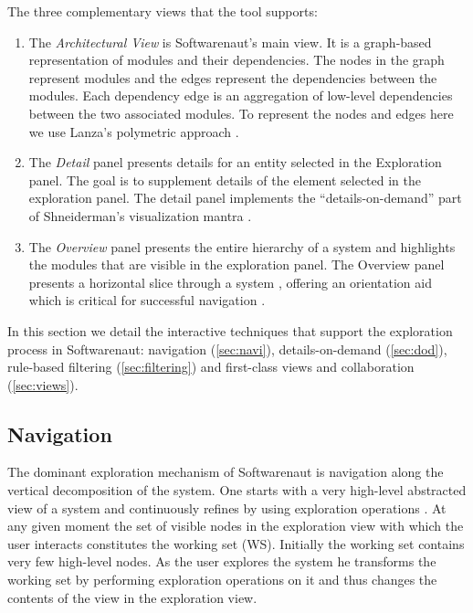 \documentclass[preprint,12pt]{elsarticle}
\begin{document}
The three complementary views that the tool supports:

\begin{enumerate}

\item The {\em Architectural View} is Softwarenaut's main view. It is a graph-based representation of modules and their dependencies. The nodes in the graph represent modules and the edges represent the dependencies between the modules. Each dependency edge is an aggregation of low-level dependencies between the two associated modules. To represent the nodes and edges here we use Lanza's polymetric approach \cite{lanza-pv, lanza-oomp}. 

\item The {\em Detail} panel presents details for an entity selected in the Exploration panel. The goal is to supplement details of the element selected in the exploration panel. The detail panel implements the ``details-on-demand'' part of Shneiderman's visualization mantra \cite{shneid-eyes}.

\item The {\em Overview} panel presents the entire hierarchy of a system and highlights the modules that are visible in the exploration panel. The Overview panel presents a horizontal slice through a system \cite{wong-thesis}, offering an orientation aid which is critical for successful navigation \cite{storey-awareness}.

\end{enumerate}

In this section we detail the interactive techniques that support the exploration process in Softwarenaut: navigation (\ref{sec:navi}), details-on-demand (\ref{sec:dod}), rule-based filtering (\ref{sec:filtering}) and first-class views and collaboration (\ref{sec:views}).  

\subsection{Navigation} 

The dominant exploration mechanism of Softwarenaut is navigation along the vertical decomposition of the system. One starts with a very high-level abstracted view of a system and continuously refines by using exploration operations \cite{robertson-conetrees}. At any given moment the set of visible nodes in the exploration view with which the user interacts constitutes the working set (WS). Initially the working set contains very few high-level nodes. As the user explores the system he transforms the working set by performing exploration operations on it and thus changes the contents of the view in the exploration view.
\end{document}
